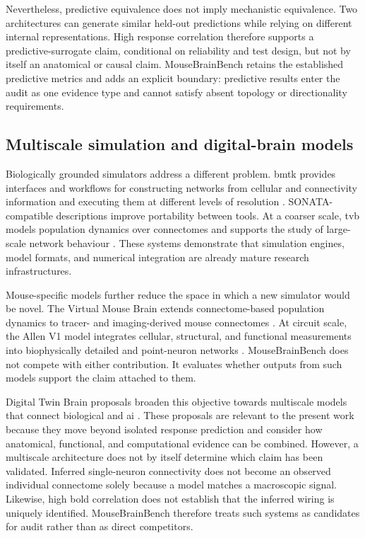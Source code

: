 \documentclass[a4paper,fleqn]{cas-sc}
\begin{document}
Nevertheless, predictive equivalence does not imply mechanistic equivalence.
Two architectures can generate similar held-out predictions while relying on
different internal representations. High response correlation therefore
supports a predictive-surrogate claim, conditional on reliability and test
design, but not by itself an anatomical or causal claim. MouseBrainBench retains
the established predictive metrics and adds an explicit boundary: predictive
results enter the audit as one evidence type and cannot satisfy absent topology
or directionality requirements.

\subsection{Multiscale simulation and digital-brain models}
\label{subsec:multiscale-simulation}

Biologically grounded simulators address a different problem. \ac{bmtk}
provides interfaces and workflows for constructing networks from cellular and
connectivity information and executing them at different levels of resolution
\citep{dai2020bmtk}. SONATA-compatible descriptions improve
portability between tools. At a coarser scale, \ac{tvb} models
population dynamics over connectomes and supports the study of large-scale
network behaviour \citep{tvb2013}. These systems demonstrate that simulation
engines, model formats, and numerical integration are already mature research
infrastructures.

Mouse-specific models further reduce the space in which a new simulator would
be novel. The Virtual Mouse Brain extends connectome-based population dynamics
to tracer- and imaging-derived mouse connectomes
\citep{melozzi2017virtualmouse}. At circuit scale, the Allen V1 model integrates
cellular, structural, and functional measurements into biophysically detailed
and point-neuron networks \citep{billeh2020v1}. MouseBrainBench does not compete
with either contribution. It evaluates whether outputs from such models support
the claim attached to them.

Digital Twin Brain proposals broaden this objective towards multiscale models
that connect biological and \acs{ai} \citep{xiong2023dtb}. These proposals are
relevant to the present work because they move beyond isolated response
prediction and consider how anatomical, functional, and computational evidence
can be combined. However, a multiscale architecture does not by itself determine
which claim has been validated. Inferred single-neuron connectivity does not
become an observed individual connectome solely because a model matches a
macroscopic signal. Likewise, high \acs{bold} correlation does not establish that
the inferred wiring is uniquely identified. MouseBrainBench therefore treats
such systems as candidates for audit rather than as direct competitors.
\end{document}
